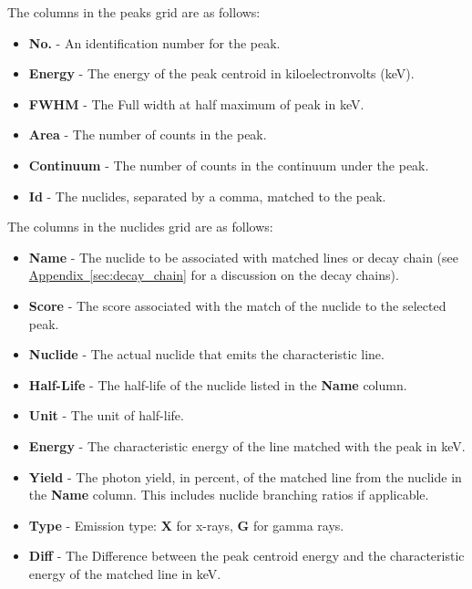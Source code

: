 \documentclass[12pt,report,justified]{SANDreport}
\begin{document}
The columns in the peaks grid are as follows:
\begin{itemize}
    \item \textbf{No.} - An identification number for the peak.
    \item \textbf{Energy} - The energy of the peak centroid in kiloelectronvolts (keV).
    \item \textbf{FWHM} - The Full width at half maximum of peak in keV.
    \item \textbf{Area} - The number of counts in the peak.
    \item \textbf{Continuum} - The number of counts in the continuum under the peak.
    \item \textbf{Id} - The nuclides, separated by a comma, matched to the peak.
\end{itemize}

The columns in the nuclides grid are as follows:
\begin{itemize}
    \item \textbf{Name} - The nuclide to be associated with matched lines or decay chain (see \hyperref[sec:decay_chain]{Appendix~\ref{sec:decay_chain}} for a discussion on the decay chains).
    \item \textbf{Score} - The score associated with the match of the nuclide to the selected peak.
    \item \textbf{Nuclide} - The actual nuclide that emits the characteristic line.
    \item \textbf{Half-Life} - The half-life of the nuclide listed in the \textbf{Name} column.
    \item \textbf{Unit} - The unit of half-life.
    \item \textbf{Energy} - The characteristic energy of the line matched with the peak in keV.
    \item \textbf{Yield} - The photon yield, in percent, of the matched line from the nuclide in the \textbf{Name} column. This includes nuclide branching ratios if applicable.
    \item \textbf{Type} - Emission type: \textbf{X} for x-rays, \textbf{G} for gamma rays.
    \item \textbf{Diff} - The Difference between the peak centroid energy and the characteristic energy of the matched line in keV.
\end{itemize}
\end{document}
